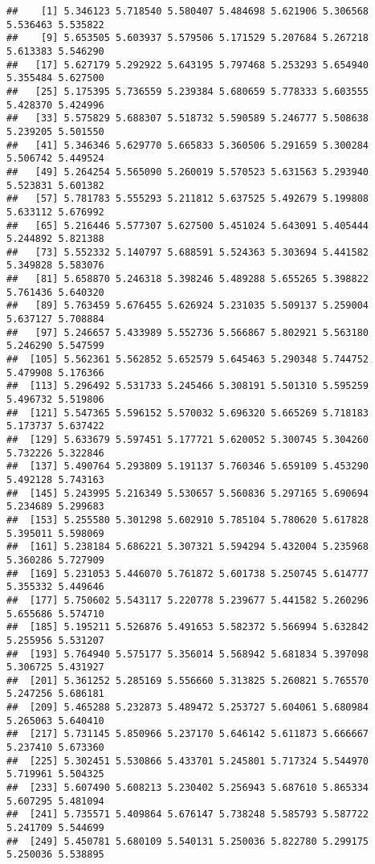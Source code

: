 \documentclass[
]{article}
\begin{document}
\begin{verbatim}
##    [1] 5.346123 5.718540 5.580407 5.484698 5.621906 5.306568 5.536463 5.535822
##    [9] 5.653505 5.603937 5.579506 5.171529 5.207684 5.267218 5.613383 5.546290
##   [17] 5.627179 5.292922 5.643195 5.797468 5.253293 5.654940 5.355484 5.627500
##   [25] 5.175395 5.736559 5.239384 5.680659 5.778333 5.603555 5.428370 5.424996
##   [33] 5.575829 5.688307 5.518732 5.590589 5.246777 5.508638 5.239205 5.501550
##   [41] 5.346346 5.629770 5.665833 5.360506 5.291659 5.300284 5.506742 5.449524
##   [49] 5.264254 5.565090 5.260019 5.570523 5.631563 5.293940 5.523831 5.601382
##   [57] 5.781783 5.555293 5.211812 5.637525 5.492679 5.199808 5.633112 5.676992
##   [65] 5.216446 5.577307 5.627500 5.451024 5.643091 5.405444 5.244892 5.821388
##   [73] 5.552332 5.140797 5.688591 5.524363 5.303694 5.441582 5.349828 5.583076
##   [81] 5.658870 5.246318 5.398246 5.489288 5.655265 5.398822 5.761436 5.640320
##   [89] 5.763459 5.676455 5.626924 5.231035 5.509137 5.259004 5.637127 5.708884
##   [97] 5.246657 5.433989 5.552736 5.566867 5.802921 5.563180 5.246290 5.547599
##  [105] 5.562361 5.562852 5.652579 5.645463 5.290348 5.744752 5.479908 5.176366
##  [113] 5.296492 5.531733 5.245466 5.308191 5.501310 5.595259 5.496732 5.519806
##  [121] 5.547365 5.596152 5.570032 5.696320 5.665269 5.718183 5.173737 5.637422
##  [129] 5.633679 5.597451 5.177721 5.620052 5.300745 5.304260 5.732226 5.322846
##  [137] 5.490764 5.293809 5.191137 5.760346 5.659109 5.453290 5.492128 5.743163
##  [145] 5.243995 5.216349 5.530657 5.560836 5.297165 5.690694 5.234689 5.299683
##  [153] 5.255580 5.301298 5.602910 5.785104 5.780620 5.617828 5.395011 5.598069
##  [161] 5.238184 5.686221 5.307321 5.594294 5.432004 5.235968 5.360286 5.727909
##  [169] 5.231053 5.446070 5.761872 5.601738 5.250745 5.614777 5.355332 5.449646
##  [177] 5.750602 5.543117 5.220778 5.239677 5.441582 5.260296 5.655686 5.574710
##  [185] 5.195211 5.526876 5.491653 5.582372 5.566994 5.632842 5.255956 5.531207
##  [193] 5.764940 5.575177 5.356014 5.568942 5.681834 5.397098 5.306725 5.431927
##  [201] 5.361252 5.285169 5.556660 5.313825 5.260821 5.765570 5.247256 5.686181
##  [209] 5.465288 5.232873 5.489472 5.253727 5.604061 5.680984 5.265063 5.640410
##  [217] 5.731145 5.850966 5.237170 5.646142 5.611873 5.666667 5.237410 5.673360
##  [225] 5.302451 5.530866 5.433701 5.245801 5.717324 5.544970 5.719961 5.504325
##  [233] 5.607490 5.608213 5.230402 5.256943 5.687610 5.865334 5.607295 5.481094
##  [241] 5.735571 5.409864 5.676147 5.738248 5.585793 5.587722 5.241709 5.544699
##  [249] 5.450781 5.680109 5.540131 5.250036 5.822780 5.299175 5.250036 5.538895

\end{verbatim}
\end{document}
